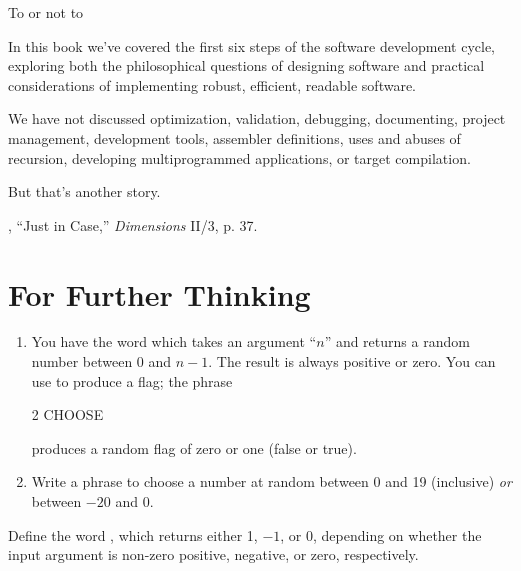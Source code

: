 \begin{tfquot}
To  or not to 
\end{tfquot}
In this book we've covered the first six steps of the software development
cycle, exploring both the philosophical questions of designing software
and practical considerations of implementing robust, efficient, readable
software.

We have not discussed optimization, validation, debugging, documenting,
project management, \Forth{} development tools, assembler
definitions, uses and abuses of recursion, developing multiprogrammed
applications, or target compilation.

But that's another story.

\begin{references}{9}
 , ``Just in Case,'' \emph{\Forth{}
Dimensions} II/3, p. 37.
\end{references}

\section{For Further Thinking}

\ifeightyfour\begin{enumerate}
\item
You have the word  which takes an argument ``$n$''
and returns a random number between 0 and $n-1$. The result is always
positive or zero.  You can use  to produce a flag; the
phrase
\begin{Code}
2 CHOOSE
\end{Code}
produces a random flag of zero or one (false or true).

\item
Write a phrase to choose a number at random between 0 and 19 (inclusive)
\emph{or} between $-20$ and 0.
\end{enumerate}\else
Define the word , which returns either 1,
$-1$, or 0, depending on whether the input argument is non-zero
positive, negative, or zero, respectively.
\fi
